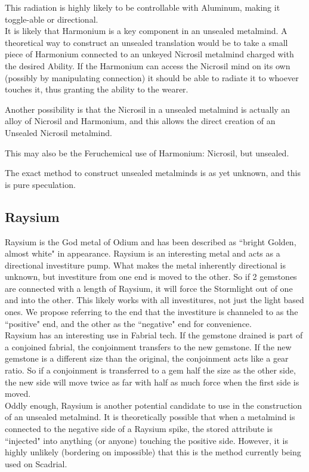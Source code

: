 \documentclass[conference]{IEEEtran}
\begin{document}
This radiation is highly likely to be controllable with Aluminum, making it toggle-able or directional.\\

It is likely that Harmonium is a key component in an unsealed metalmind.  A theoretical way to construct an unsealed translation would be to take a small piece of Harmonium connected to an unkeyed Nicrosil metalmind charged with the desired Ability.  If the Harmonium can access the Nicrosil mind on its own (possibly by manipulating connection) it should be able to radiate it to whoever touches it, thus granting the ability to the wearer. 

Another possibility is that the Nicrosil in a unsealed metalmind is actually an alloy of Nicrosil and Harmonium, and this allows the direct creation of an Unsealed Nicrosil metalmind.

This may also be the Feruchemical use of Harmonium: Nicrosil, but unsealed.

The exact method to construct unsealed metalminds is as yet unknown, and this is pure speculation.  
\subsection*{Raysium}
Raysium is the God metal of Odium and has been described as ``bright Golden, almost white" in appearance.  Raysium is an interesting metal and acts as a directional investiture pump.  What makes the metal inherently directional is unknown, but investiture from one end is moved to the other.  So if 2 gemstones are connected with a length of Raysium, it will force the Stormlight out of one and into the other.  This likely works with all investitures, not just the light based ones.  We propose referring to the end that the investiture is channeled to as the ``positive" end, and the other as the ``negative" end for convenience.\\

Raysium has an interesting use in Fabrial tech.  If the gemstone drained is part of a conjoined fabrial, the conjoinment transfers to the new gemstone.  If the new gemstone is a different size than the original, the conjoinment acts like a gear ratio.  So if a conjoinment is transferred to a gem half the size as the other side, the new side will move twice as far with half as much force when the first side is moved.\\

Oddly enough, Raysium is another potential candidate to use in the construction of an unsealed metalmind.  It is theoretically possible that when a metalmind is connected to the negative side of a Raysium spike, the stored attribute is ``injected" into anything (or anyone) touching the positive side.  However, it is highly unlikely (bordering on impossible) that this is the method currently being used on Scadrial.  
\end{document}
